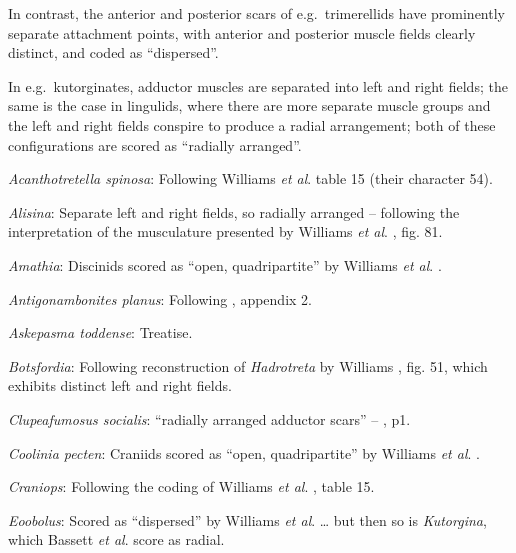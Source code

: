 \documentclass[openany]{book}
\theoremstyle{definition}
\theoremstyle{definition}
\theoremstyle{definition}
\theoremstyle{remark}
\begin{document}
In contrast, the anterior and posterior scars of e.g.~trimerellids have
prominently separate attachment points, with anterior and posterior
muscle fields clearly distinct, and coded as ``dispersed''.

In e.g.~kutorginates, adductor muscles are separated into left and right
fields; the same is the case in lingulids, where there are more separate
muscle groups and the left and right fields conspire to produce a radial
arrangement; both of these configurations are scored as ``radially
arranged''.

\hypertarget{Acanthotretella_spinosa-coding-76}{}
\emph{Acanthotretella spinosa}: Following Williams \emph{et al}.
\citeyearpar{Williams2000LinguliformeaCraniiformea} table 15 (their
character 54).

\hypertarget{Alisina-coding-76}{}
\emph{Alisina}: Separate left and right fields, so radially arranged --
following the interpretation of the musculature presented by Williams
\emph{et al}. \citeyearpar{Williams2000LinguliformeaCraniiformea}, fig.
81.

\hypertarget{Amathia-coding-76}{}
\emph{Amathia}: Discinids scored as ``open, quadripartite'' by Williams
\emph{et al}. \citeyearpar{Williams1996Asupra}.

\hypertarget{Antigonambonites_planus-coding-76}{}
\emph{Antigonambonites planus}: Following
\citet{Williams1998Thediversity}, appendix 2.

\hypertarget{Askepasma_toddense-coding-76}{}
\emph{Askepasma toddense}: Treatise.

\hypertarget{Botsfordia-coding-76}{}
\emph{Botsfordia}: Following reconstruction of \emph{Hadrotreta} by
Williams \citeyearpar{Williams2000LinguliformeaCraniiformea}, fig. 51,
which exhibits distinct left and right fields.

\hypertarget{Clupeafumosus_socialis-coding-76}{}
\emph{Clupeafumosus socialis}: ``radially arranged adductor scars'' --
\citet{Bassett2017Earliestontogeny}, p1.

\hypertarget{Coolinia_pecten-coding-76}{}
\emph{Coolinia pecten}: Craniids scored as ``open, quadripartite'' by
Williams \emph{et al}. \citeyearpar{Williams1996Asupra}.

\hypertarget{Craniops-coding-76}{}
\emph{Craniops}: Following the coding of Williams \emph{et al}.
\citeyearpar{Williams2000LinguliformeaCraniiformea}, table 15.

\hypertarget{Eoobolus-coding-76}{}
\emph{Eoobolus}: Scored as ``dispersed'' by Williams \emph{et al}.
\citeyearpar{Williams1998Thediversity} \ldots{} but then so is
\emph{Kutorgina}, which Bassett \emph{et al}.
\citeyearpar{Bassett2001Functionalmorphology} score as radial.
\end{document}
